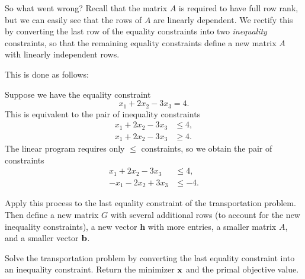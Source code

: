 So what went wrong? Recall that the matrix $A$ is required to have full row rank, but we can easily see that the rows of $A$
are linearly dependent. We rectify this by converting the last row of the equality constraints into two \emph{inequality} constraints, so that
the remaining equality constraints define a new matrix $A$ with linearly independent rows.

This is done as follows:

 Suppose we have the equality constraint
\[
x_1 + 2x_2 - 3x_3 = 4.
\]
This is equivalent to the pair of inequality
constraints
\begin{align*}
x_1 + 2x_2 - 3x_3 &\leq 4, \\
x_1 + 2x_2 - 3x_3 &\geq 4.
\end{align*}
The linear program requires only $\leq$ constraints, so we obtain the pair
of constraints
\begin{align*}
x_1 + 2x_2 - 3x_3 &\leq 4, \\
-x_1 - 2x_2 + 3x_3 &\leq -4.
\end{align*}

Apply this process to the last equality constraint of the transportation problem.
Then define a new matrix $G$ with several additional rows (to account for the new inequality
constraints), a new vector $\mathbf{h}$ with more entries, a smaller matrix $A$, and a smaller vector $\mathbf{b}$.
\begin{problem}
Solve the transportation problem by converting the last equality constraint into an inequality constraint.
Return the minimizer $\mathbf{x}$ and the primal objective value.
\end{problem}

